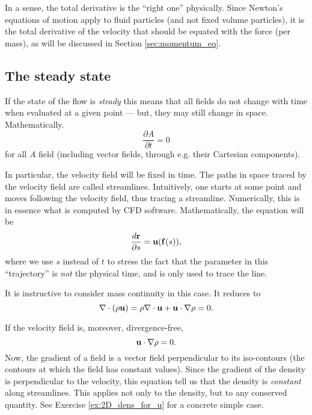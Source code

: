In a sense, the total derivative is the ``right one'' physically. Since
Newton's equations of motion apply to fluid particles (and not fixed volume particles),
it is the total derivative of the velocity that should be equated with the force (per mass),
as will be discussed in Section \ref{sec:momentum_eq}.


\subsection{The steady state}

If the state of the flow is \emph{steady} this means that
all fields do not change with time when evaluated at a given
point --- but, they may still change in space. Mathematically.
\begin{equation*}
\frac{\partial A}{\partial t} = 0
\end{equation*}
for all $A$ field (including vector fields, through e.g. their
Cartesian components).

In particular, the velocity field will be fixed in time. The paths
in space traced by the velocity field are called streamlines.
Intuitively, one starts at some point and moves following the
velocity field, thus tracing a streamline. Numerically, this is
in essence what is computed by CFD software. Mathematically, the
equation will be
\begin{equation*}
\frac{d \mathbf{r}}{\partial s} = \mathbf{u}( \mathbf{f}(s) ) ,
\end{equation*}
where we use $s$ instead of $t$ to stress the fact that the
parameter in this ``trajectory'' is \emph{not} the physical time,
and is only used to trace the line.

It is instructive to consider mass continuity in this case.
It reduces to
\begin{equation*}
\nabla \cdot (\rho \mathbf{u} ) =   
\rho \nabla \cdot \mathbf{u} + \mathbf{u}   \cdot \nabla \rho  = 0 .
\end{equation*}

If the velocity field is, moreover, divergence-free,
\begin{equation*}
 \mathbf{u}   \cdot \nabla \rho  = 0 .
\end{equation*}
Now, the gradient of a field is a vector field perpendicular to
its iso-contours (the contours at which the field has constant
values). Since the gradient of the density is perpendicular to
the velocity, this equation tell us that the density is
\emph{constant} along streamlines. This applies not only
to the density, but to any conserved quantity. See Exercise
\ref{ex:2D_dens_for_u} for a concrete simple case.

